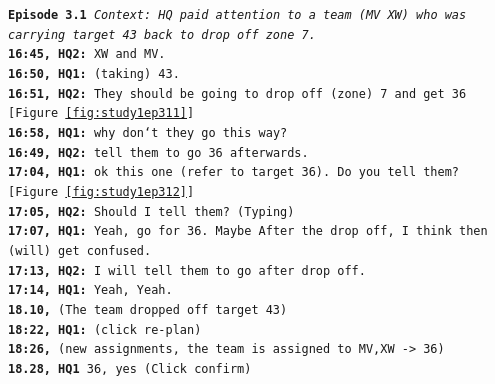 \noindent\texttt{\textbf{Episode 3.1}
\emph{Context: HQ paid attention to a team (MV XW) who was carrying target 43 back to drop off zone 7.}\\
\textbf{16:45, HQ2:} XW and MV.\\
\textbf{16:50, HQ1:} (taking) 43. \\
\textbf{16:51, HQ2:} They should be going to drop off (zone) 7 and get 36 [Figure \ref{fig:study1ep311}] \\
\textbf{16:58, HQ1:} why don`t they go this way?\\
\textbf{16:49, HQ2:} tell them to go 36 afterwards.\\
\textbf{17:04, HQ1:} ok this one (refer to target 36). Do you tell them? [Figure \ref{fig:study1ep312}]\\
\textbf{17:05, HQ2:} Should I tell them? (Typing)\\
\textbf{17:07, HQ1:} Yeah, go for 36. Maybe After the drop off, I think then (will) get confused.\\
\textbf{17:13, HQ2:} I will tell them to go after drop off.\\
\textbf{17:14, HQ1:} Yeah, Yeah. \\
\textbf{18.10,} (The team dropped off target 43)\\
\textbf{18:22, HQ1:} (click re-plan) \\
\textbf{18:26,} (new assignments, the team is assigned to MV,XW -> 36)\\
\textbf{18.28, HQ1} 36, yes (Click confirm)\\
}

